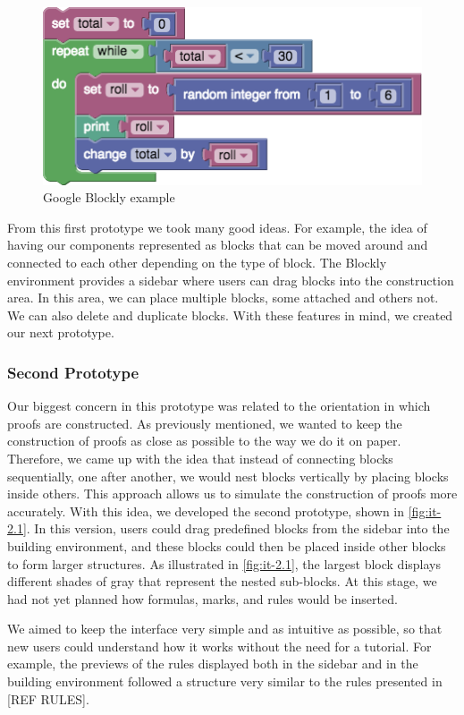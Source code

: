 \begin{figure}[h]
    \centering
    \includegraphics[width=0.6\linewidth]{Chapters/Figures/image6.png}
    \caption{Google Blockly example}
    \label{fig:google_blockly}
\end{figure}

From this first prototype we took many good ideas. For example, the idea of having our components represented as blocks that can be moved around and connected to each other depending on the type of block. The Blockly environment provides a sidebar where users can drag blocks into the construction area. In this area, we can place multiple blocks, some attached and others not. We can also delete and duplicate blocks. With these features in mind, we created our next prototype.

\subsubsection{Second Prototype}
Our biggest concern in this prototype was related to the orientation in which proofs are constructed. As previously mentioned, we wanted to keep the construction of proofs as close as possible to the way we do it on paper. Therefore, we came up with the idea that instead of connecting blocks sequentially, one after another, we would nest blocks vertically by placing blocks inside others. This approach allows us to simulate the construction of proofs more accurately. With this idea, we developed the second prototype, shown in \autoref{fig:it-2.1}. In this version, users could drag predefined blocks from the sidebar into the building environment, and these blocks could then be placed inside other blocks to form larger structures. As illustrated in \autoref{fig:it-2.1}, the largest block displays different shades of gray that represent the nested sub-blocks. At this stage, we had not yet planned how formulas, marks, and rules would be inserted.

We aimed to keep the interface very simple and as intuitive as possible, so that new users could understand how it works without the need for a tutorial. For example, the previews of the rules displayed both in the sidebar and in the building environment followed a structure very similar to the rules presented in [REF RULES].



